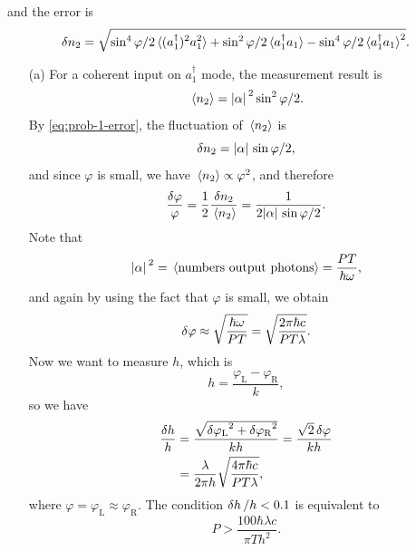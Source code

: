 \documentclass[hyperref, a4paper]{article}
\begin{document}
and the error is 
\begin{equation}
    \var{n_2} = \sqrt{\sin^4 \varphi / 2 \expval*{(a_1^\dagger)^2 a_1^2} + \sin^2 \varphi / 2 \expval*{a_1^\dagger a_1} - \sin^4 \varphi / 2 \expval*{a_1^\dagger a_1}^2}.
    \label{eq:prob-1-error}
\end{equation}
\begin{itemize}
\item[(a)] For a coherent input on $a_1^\dagger$ mode, the measurement result is 
\begin{equation}
    \expval*{n_2} = \abs*{\alpha}^2 \sin^2 \varphi / 2.
\end{equation} 
By \eqref{eq:prob-1-error}, the fluctuation of $\expval*{n_2}$ is 
\[
    \var{n_2} = \abs*{\alpha} \sin \varphi / 2 ,
\]
and since $\varphi$ is small, we have $\expval*{n_2} \propto \varphi^2$, and therefore 
\begin{equation}
    \frac{\var{\varphi}}{\varphi} = \frac{1}{2} \frac{\var{n_2}}{\expval*{n_2}} = \frac{1}{2 \abs*{\alpha} \sin \varphi / 2}.
    \label{eq:prob-2-phi-error-1}
\end{equation}
Note that 
\[
    \abs*{\alpha}^2 = \expval*{\text{numbers output photons}} = \frac{PT}{\hbar \omega}, 
\]
and again by using the fact that $\varphi$ is small, we obtain 
\begin{equation}
    \var{\varphi} \approx \sqrt{\frac{\hbar \omega}{PT}} 
    = \sqrt{\frac{2 \pi \hbar c}{PT \lambda}}. 
\end{equation}
Now we want to measure $h$, which is 
\begin{equation}
    h = \frac{\varphi_\text{L} - \varphi_\text{R}}{k}, 
\end{equation}
so we have 
\begin{equation}
    \begin{aligned}
        \frac{\var{h}}{h} &= \frac{\sqrt{\var{\varphi_\text{L}}^2 + \var{\varphi_\text{R}}^2}}{k h} = \frac{\sqrt{2} \var{\varphi} }{k h} \\
        &= \frac{\lambda}{2 \pi h} \sqrt{\frac{4 \pi \hbar c}{P T \lambda}},
    \end{aligned}
\end{equation}
where $\varphi = \varphi_\text{L} \approx \varphi_\text{R}$.
The condition $\var{h} / h < 0.1$ is equivalent to 
\begin{equation}
    P > \frac{100 \hbar \lambda c}{\pi T h^2}.
    \label{eq:prob-2-condition}
\end{equation}


\end{itemize}
\end{document}
